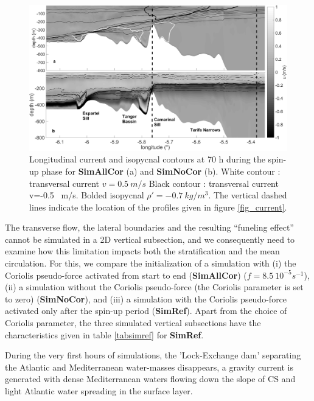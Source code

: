 %
\begin{figure}[!t]
 \centering
 \includegraphics[width=1\textwidth]{./papier2D/stratif_corio_vs_nocorio.png}
 \caption {Longitudinal current and isopycnal contours at 70 h during the spin-up phase for \textbf{SimAllCor} (a) and \textbf{SimNoCor} (b).
 White contour : transversal current $v = 0.5 \ m/s$  Black contour : transversal current v=-0.5 \ m/s. Bolded isopycnal $\rho' = -0.7 \ kg/m^3$.
 The vertical dashed lines indicate the location of the profiles given in figure \ref{fig_current}.}
  \label{fig2}
\end{figure}
The transverse flow, the lateral boundaries and the resulting ``funeling effect'' cannot be simulated in a 2D vertical subsection, and we consequently need to examine how this limitation impacts both the stratification and the mean circulation. For this, we compare the initialization of a simulation with (i) the Coriolis pseudo-force activated from start to end (\textbf{SimAllCor}) ($f = 8.5 \ 10^{-5} s^{-1}$), (ii) a simulation without the Coriolis pseudo-force (the Coriolis parameter is set to zero) (\textbf{SimNoCor}), and (iii) a simulation with the Coriolis pseudo-force activated only after the spin-up period (\textbf{SimRef}). Apart from the choice of Coriolis parameter, the three simulated vertical subsections have the characteristics given in table \ref{tabsimref} for \textbf{SimRef}.

During the very first hours of simulations, the 'Lock-Exchange dam' separating the Atlantic and Mediterranean water-masses disappears, a gravity current is generated with dense Mediterranean waters flowing down the slope of CS and light Atlantic water spreading in the surface layer.


